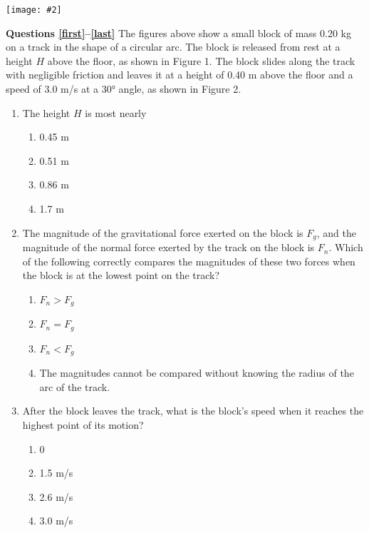 \documentclass[11pt]{article}
\newcommand{\pic}[2]{\texttt{[image: \#2]}}
\begin{document}
\begin{multicols}{2}
  \begin{center}
    \pic{.5}{circular-arc}
  \end{center}
  \textbf{Questions \ref{first}--\ref{last}} The figures above show a small
  block of mass 0.20 kg on a track in the shape of a circular arc. The block is
  released from rest at a height $H$ above the floor, as shown in Figure 1. The
  block slides along the track with negligible friction and leaves it at a
  height of 0.40 m above the floor and a speed of 3.0 m/s at a \ang{30} angle,
  as shown in Figure 2.

  \begin{enumerate}[leftmargin=18pt,resume]
  \item The height $H$ is most nearly
    \begin{enumerate}[noitemsep,topsep=0pt,leftmargin=18pt,label=(\Alph*)]
    \item 0.45 m
    \item 0.51 m
    \item 0.86 m
    \item 1.7 m
    \end{enumerate}
    \label{first}
    
  \item The magnitude of the gravitational force exerted on the block is $F_g$,
    and the magnitude of the normal force exerted by the track on the block is
    $F_n$. Which of the following correctly compares the magnitudes of these
    two forces when the block is at the lowest point on the track?
    \begin{enumerate}[nosep,leftmargin=18pt,label=(\Alph*)]
    \item $F_n>F_g$
    \item $F_n=F_g$
    \item $F_n<F_g$
    \item The magnitudes cannot be compared without knowing the radius of the
      arc of the track.
    \end{enumerate}
    \vspace{.7in}
    
  \item After the block leaves the track, what is the block's speed when it
    reaches the highest point of its motion?
    \begin{enumerate}[nosep,leftmargin=18pt,label=(\Alph*)]
    \item 0
    \item 1.5 m/s
    \item 2.6 m/s
    \item 3.0 m/s
    \end{enumerate}
    \label{last}
    \vspace{.7in}
    

\end{enumerate}
\end{multicols}
\end{document}
